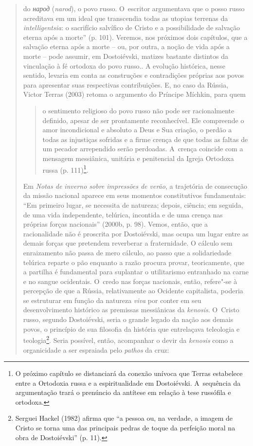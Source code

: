 {\begin{quote}
{  do \emph{народ}
  (\emph{narod}), o povo russo. O~escritor argumentava que o posso russo
  acreditava em um ideal que transcendia todas as utopias terrenas da
  \emph{intelligentsia}: o sacrifício salvífico de Cristo e a
  possibilidade de salvação eterna após a morte'' (p. 101). Veremos, nos
  próximos dois capítulos, que a salvação eterna após a morte -- ou, por
  outra, a noção de vida após a morte -- pode assumir, em Dostoiévski,
  matizes bastante distintos da vinculação à fé ortodoxa do povo russo.}.
A evolução histórica, nesse sentido, levaria em conta as construções e
contradições próprias aos povos para apresentar suas respectivas
contribuições. E, no caso da Rússia, Victor Terras (2003) retoma o
argumento do Príncipe Míchkin, para quem

\begin{quote}
o sentimento religioso do povo russo não pode ser racionalmente
definido, apesar de ser prontamente reconhecível. Ele compreende o amor
incondicional e absoluto a Deus e Sua criação, o perdão a todas as
injustiças sofridas e a firme crença de que todas as faltas de um
pecador arrependido serão perdoadas. A~crença coincide com a mensagem
messiânica, unitária e penitencial da Igreja Ortodoxa russa (p.
111)\footnote{O próximo capítulo se distanciará da conexão unívoca que
  Terras estabelece entre a Ortodoxia russa e a espiritualidade em
  Dostoiévski. A~sequência da argumentação trará o prenúncio da antítese
  em relação à tese russófila e ortodoxa.}.
\end{quote}

Em \emph{Notas de inverno sobre impressões de verão}, a trajetória de
consecução da missão nacional aparece em seus momentos constitutivos
fundamentais: ``Em primeiro lugar, se necessita de natureza; depois,
ciência; em seguida, de uma vida independente, telúrica, incontida e de
uma crença nas próprias forças nacionais'' (2000b, p. 98). Vemos, então,
que a racionalidade não é proscrita por Dostoiévski, mas ocupa um lugar
entre as demais forças que pretendem reverberar a fraternidade. O
cálculo sem enraizamento não passa de mero cálculo, ao passo que a
solidariedade telúrica reparte o pão enquanto a razão procura provar,
teoricamente, que a partilha é fundamental para suplantar o utilitarismo
entranhado na carne e no sangue ocidentais. O~credo nas forças
nacionais, então, refere"-se à percepção de que a Rússia, relativamente
ao Ocidente capitalista, poderia se estruturar em função da natureza
\emph{viva} por conter em seu desenvolvimento histórico as premissas
messiânicas da \emph{kenosis}. O~Cristo russo, segundo Dostoiévski,
seria o grande legado da nação aos demais povos, o princípio de sua
filosofia da história que entrelaçava teleologia e teologia\footnote{Serguei
  Hackel (1982) afirma que ``a pessoa ou, na verdade, a imagem de Cristo
  se torna uma das principais pedras de toque da perfeição moral na obra
  de Dostoiévski'' (p. 11).}. Seria possível, então, acompanhar o devir
da \emph{kenosis} como a organicidade a ser espraiada pelo \emph{pathos}
da cruz:


\end{quote}}
